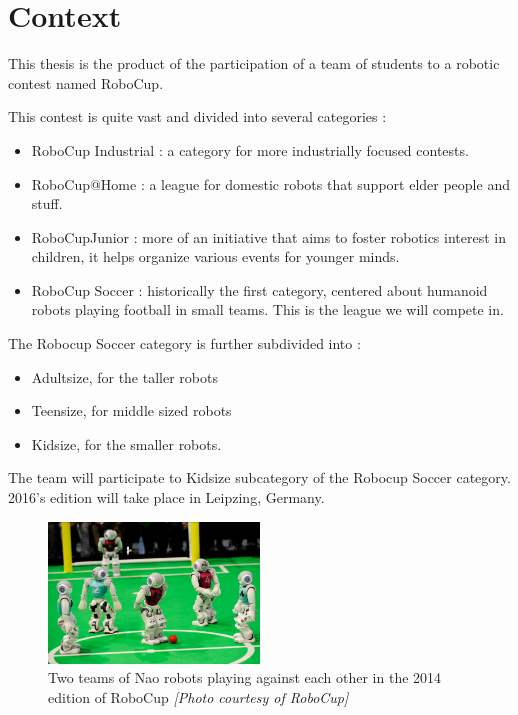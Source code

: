 \section{Context}
This thesis is the product of the participation of a team of students to a robotic contest named RoboCup. 

This contest is quite vast and divided into several categories :
\begin{itemize}
\item RoboCup Industrial : a category for more industrially focused contests.
\item RoboCup@Home : a league for domestic robots that support elder people and stuff.
\item RoboCupJunior : more of an initiative that aims to foster robotics interest in children, it helps organize various events for younger minds.
\item RoboCup Soccer : historically the first category, centered about humanoid robots playing football in small teams. This is the league we will compete in.
\end{itemize}
The Robocup Soccer category is further subdivided into :\begin{itemize}
\item Adultsize, for the taller robots
\item Teensize, for middle sized robots
\item Kidsize, for the smaller robots.
\end{itemize}

The team will participate to Kidsize subcategory of the Robocup Soccer category. 2016's edition will take place in Leipzing, Germany.

\begin{figure}[htp]
\center
\includegraphics[width=0.5\textwidth]{figures/robocup}
\caption[Two teams of Nao robots playing against each other]{Two teams of Nao robots playing against each other in the 2014 edition of RoboCup \textit{[Photo courtesy of RoboCup]}}
\label{fig:intro_robocup}
\end{figure}

